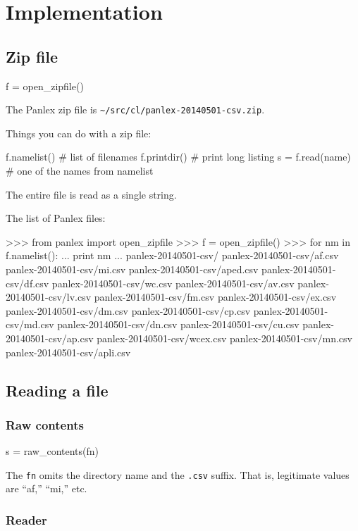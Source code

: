 \section{Implementation}

\subsection{Zip file}

\begin{myverb}
f = open_zipfile()
\end{myverb}
The Panlex zip file is \verb|~/src/cl/panlex-20140501-csv.zip|.

Things you can do with a zip file:
\begin{myverb}
f.namelist()      # list of filenames
f.printdir()      # print long listing
s = f.read(name)  # one of the names from namelist
\end{myverb}
The entire file is read as a single string.

The list of Panlex files:
\begin{myverb}
>>> from panlex import open_zipfile
>>> f = open_zipfile()
>>> for nm in f.namelist():
...     print nm
...
panlex-20140501-csv/
panlex-20140501-csv/af.csv
panlex-20140501-csv/mi.csv
panlex-20140501-csv/aped.csv
panlex-20140501-csv/df.csv
panlex-20140501-csv/wc.csv
panlex-20140501-csv/av.csv
panlex-20140501-csv/lv.csv
panlex-20140501-csv/fm.csv
panlex-20140501-csv/ex.csv
panlex-20140501-csv/dm.csv
panlex-20140501-csv/cp.csv
panlex-20140501-csv/md.csv
panlex-20140501-csv/dn.csv
panlex-20140501-csv/cu.csv
panlex-20140501-csv/ap.csv
panlex-20140501-csv/wcex.csv
panlex-20140501-csv/mn.csv
panlex-20140501-csv/apli.csv
\end{myverb}

\subsection{Reading a file}

\subsubsection{Raw contents}

\begin{myverb}
s = raw_contents(fn)
\end{myverb}
The {\tt fn} omits the directory name and the {\tt .csv} suffix.  That
is, legitimate values are ``af,'' ``mi,'' etc.

\subsubsection{Reader}

